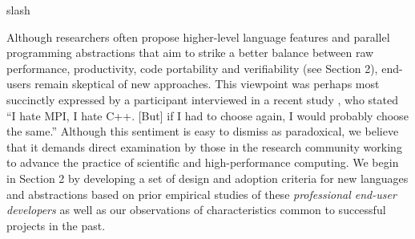 \documentclass[10pt, conference, compsocconf]{IEEEtran}
\begin{document}
slash

Although researchers often propose higher-level language features and parallel programming abstractions that aim to strike a better balance between raw performance, productivity, code portability and verifiability (see Section 2), end-users remain skeptical of new approaches. This viewpoint was perhaps most succinctly expressed by a participant interviewed in a recent study \cite{basili2008understanding}, who stated ``I hate MPI, I hate C++. [But] if I had to choose again, I would probably choose the same.'' Although this sentiment is easy to dismiss as paradoxical, we believe that it demands direct examination by those in the research community working to advance the practice of scientific and high-performance computing. We begin in Section 2 by developing a set of design and adoption criteria for new languages and abstractions based on prior empirical studies of these {\it professional end-user developers} as well as our observations of characteristics common to successful projects in the past. 

%
% 

\end{document}
